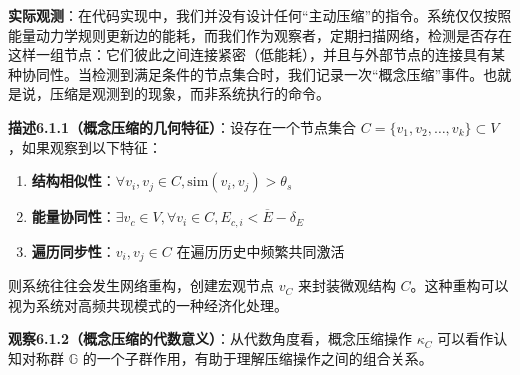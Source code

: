 \documentclass[12pt,a4paper]{article}
\newcommand{\cognitivegroup}{\mathbb{G}}
\begin{document}
\textbf{实际观测}：在代码实现中，我们并没有设计任何“主动压缩”的指令。系统仅仅按照能量动力学规则更新边的能耗，而我们作为观察者，定期扫描网络，检测是否存在这样一组节点：它们彼此之间连接紧密（低能耗），并且与外部节点的连接具有某种协同性。当检测到满足条件的节点集合时，我们记录一次“概念压缩”事件。也就是说，压缩是观测到的现象，而非系统执行的命令。

\textbf{描述6.1.1（概念压缩的几何特征）}：设存在一个节点集合 $C = \{v_1, v_2, \ldots, v_k\} \subset V$，如果观察到以下特征：
\begin{enumerate}
\item \textbf{结构相似性}：$\forall v_i, v_j \in C, \text{sim}(v_i, v_j) > \theta_s$
\item \textbf{能量协同性}：$\exists v_c \in V, \forall v_i \in C, E_{c,i} < \overline{E} - \delta_E$
\item \textbf{遍历同步性}：$v_i, v_j \in C$ 在遍历历史中频繁共同激活
\end{enumerate}
则系统往往会发生网络重构，创建宏观节点 $v_C$ 来封装微观结构 $C$。这种重构可以视为系统对高频共现模式的一种经济化处理。

\textbf{观察6.1.2（概念压缩的代数意义）}：从代数角度看，概念压缩操作 $\kappa_C$ 可以看作认知对称群 $\cognitivegroup$ 的一个子群作用，有助于理解压缩操作之间的组合关系。
\end{document}
